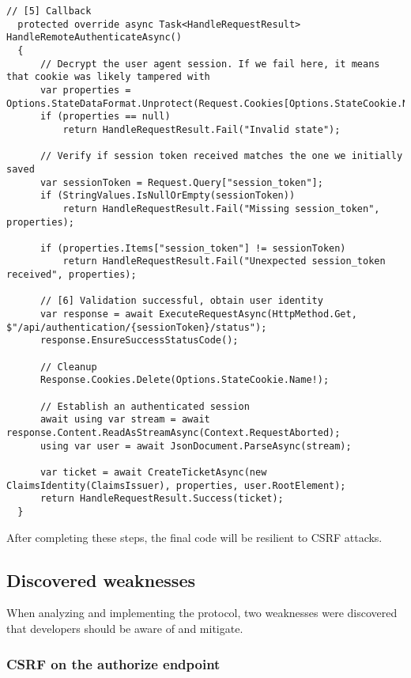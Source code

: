 \begin{lstlisting}[caption={Handling access token creation}, label={lst:dokobit-handleremote}]
  // [5] Callback
  protected override async Task<HandleRequestResult> HandleRemoteAuthenticateAsync()
  {
      // Decrypt the user agent session. If we fail here, it means that cookie was likely tampered with
      var properties = Options.StateDataFormat.Unprotect(Request.Cookies[Options.StateCookie.Name!]);
      if (properties == null)
          return HandleRequestResult.Fail("Invalid state");
  
      // Verify if session token received matches the one we initially saved
      var sessionToken = Request.Query["session_token"];
      if (StringValues.IsNullOrEmpty(sessionToken))
          return HandleRequestResult.Fail("Missing session_token", properties);
  
      if (properties.Items["session_token"] != sessionToken)
          return HandleRequestResult.Fail("Unexpected session_token received", properties);
  
      // [6] Validation successful, obtain user identity
      var response = await ExecuteRequestAsync(HttpMethod.Get, $"/api/authentication/{sessionToken}/status");
      response.EnsureSuccessStatusCode();
  
      // Cleanup
      Response.Cookies.Delete(Options.StateCookie.Name!);
  
      // Establish an authenticated session
      await using var stream = await response.Content.ReadAsStreamAsync(Context.RequestAborted);
      using var user = await JsonDocument.ParseAsync(stream);
  
      var ticket = await CreateTicketAsync(new ClaimsIdentity(ClaimsIssuer), properties, user.RootElement);
      return HandleRequestResult.Success(ticket);
  }
\end{lstlisting}

After completing these steps, the final code will be resilient to CSRF attacks.

\subsection{Discovered weaknesses}

When analyzing and implementing the protocol, two weaknesses were discovered that developers should be aware of and mitigate.

\subsubsection{CSRF on the authorize endpoint}

